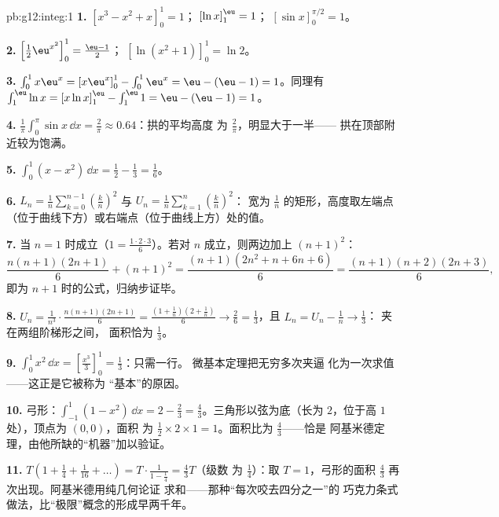 \begin{solution}{pb:g12:integ:1}
\textbf{1.} $\left[x^3 - x^2 + x\right]_0^1 = 1$；\quad
$\left[\ln x\right]_1^{\eu} = 1$；\quad
$\left[\sin x\right]_0^{\pi/2} = 1$。

\textbf{2.} $\left[\frac12 \eu^{x^2}\right]_0^1 =
\frac{\eu - 1}{2}$；\quad
$\left[\ln(x^2 + 1)\right]_0^1 = \ln 2$。

\textbf{3.} $\int_0^1 x\eu^x = \left[x\eu^x\right]_0^1 -
\int_0^1 \eu^x = \eu - (\eu - 1) = 1$。同理有
$\int_1^{\eu} \ln x = \left[x\ln x\right]_1^{\eu} -
\int_1^{\eu} 1 = \eu - (\eu - 1) = 1$。

\textbf{4.} $\frac{1}{\pi}\int_0^\pi \sin x\,\dd x =
\frac{2}{\pi} \approx 0.64$：拱的平均高度
为 $\frac2\pi$，明显大于一半——
拱在顶部附近较为饱满。

\textbf{5.} $\int_0^1 (x - x^2)\,\dd x = \frac12 - \frac13 =
\frac16$。

\textbf{6.} $L_n = \frac1n \sum_{k=0}^{n-1}
\left(\frac kn\right)^2$ 与
$U_n = \frac1n \sum_{k=1}^{n} \left(\frac kn\right)^2$：
宽为 $\frac1n$ 的矩形，高度取左端点
（位于曲线下方）或右端点（位于曲线上方）处的值。

\textbf{7.} 当 $n = 1$ 时成立（$1 = \frac{1 \cdot 2 \cdot
3}{6}$）。若对 $n$ 成立，则两边加上 $(n+1)^2$：
\[
\frac{n(n+1)(2n+1)}{6} + (n+1)^2
= \frac{(n+1)\left(2n^2 + n + 6n + 6\right)}{6}
= \frac{(n+1)(n+2)(2n+3)}{6},
\]
即为 $n + 1$ 时的公式，归纳步证毕。

\textbf{8.} $U_n = \frac{1}{n^3} \cdot
\frac{n(n+1)(2n+1)}{6} = \frac{(1 + \frac1n)(2 + \frac1n)}{6}
\to \frac26 = \frac13$，且 $L_n = U_n - \frac1n \to \frac13$：
夹在两组阶梯形之间，
面积恰为 $\frac13$。

\textbf{9.} $\int_0^1 x^2\,\dd x =
\left[\frac{x^3}{3}\right]_0^1 = \frac13$：只需一行。
微基本定理把无穷多次夹逼
化为一次求值——这正是它被称为
“基本”的原因。

\textbf{10.} 弓形：$\int_{-1}^{1}(1 - x^2)\,\dd x =
2 - \frac23 = \frac43$。三角形以弦为底（长为
$2$，位于高 $1$ 处），顶点为 $(0,0)$，面积
为 $\frac12 \times 2 \times 1 = 1$。面积比为 $\frac43$——恰是
阿基米德定理，由他所缺的“机器”加以验证。

\textbf{11.} $T\left(1 + \frac14 + \frac{1}{16} + \dots\right)
= T \cdot \frac{1}{1 - \frac14} = \frac43 T$（级数
为 $\frac14$）：取 $T = 1$，弓形的面积
$\frac43$ 再次出现。阿基米德用纯几何论证
求和——那种“每次咬去四分之一”的
巧克力条式做法，比“极限”概念的形成早两千年。


\end{solution}

